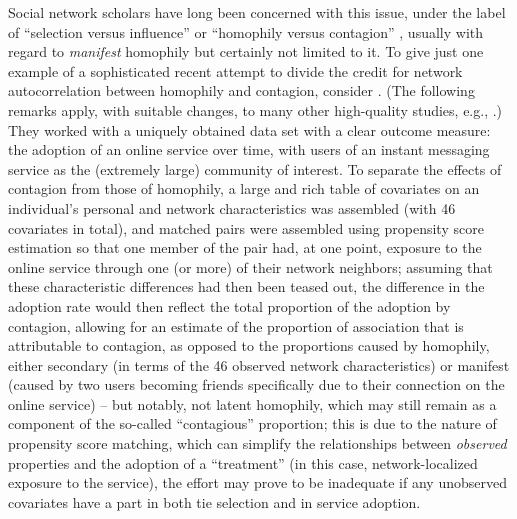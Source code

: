 \documentclass{article}
\begin{document}
\begin{multicols}{2}
Social network scholars have long been concerned with this issue, under the
label of ``selection versus influence'' or ``homophily versus contagion''
\citep{Leenders-structure-and-influence}, usually with regard to {\em manifest}
homophily but certainly not limited to it. To give just one example of a
sophisticated recent attempt to divide the credit for network autocorrelation
between homophily and contagion, consider \citet{aral2009distinguishing}.  (The
following remarks apply, with suitable changes, to many other high-quality
studies, e.g., \citet{Bakshy-Karrer-Adamic,flickr-tagging-influence,%
  Yang-Longini-Halloran-detecing-transmission,bramoulle2009ipetsn}.)  They
worked with a uniquely obtained data set with a clear outcome measure: the
adoption of an online service over time, with users of an instant messaging
service as the (extremely large) community of interest.  To separate the
effects of contagion from those of homophily, a large and rich table of
covariates on an individual's personal and network characteristics was
assembled (with 46 covariates in total), and matched pairs were assembled using
propensity score estimation \citep{Rosenbaum-Rubin-1983} so that one member of
the pair had, at one point, exposure to the online service through one (or
more) of their network neighbors; assuming that these characteristic
differences had then been teased out, the difference in the adoption rate would
then reflect the total proportion of the adoption by contagion, allowing for an
estimate of the proportion of association that is attributable to contagion, as
opposed to the proportions caused by homophily, either secondary (in terms of
the 46 observed network characteristics) or manifest (caused by two users
becoming friends specifically due to their connection on the online service) --
but notably, not latent homophily, which may still remain as a component of the
so-called ``contagious'' proportion; this is due to the nature of propensity
score matching, which can simplify the relationships between {\em observed}
properties and the adoption of a ``treatment'' (in this case, network-localized
exposure to the service), the effort may prove to be inadequate if any
unobserved covariates have a part in both tie selection and in service
adoption.


\end{multicols}
\end{document}
